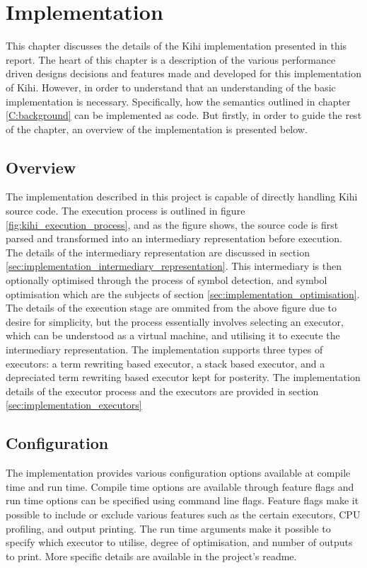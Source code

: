 \chapter{Implementation} \label{C:implementation} 
This chapter discusses the details of the Kihi implementation presented in this report. The heart of this chapter is a description of the various performance driven designs decisions and features made and developed for this implementation of Kihi. However, in order to understand that an understanding of the basic implementation is necessary. Specifically, how the semantics outlined in chapter \ref{C:background} can be implemented as code. But firstly, in order to guide the rest of the chapter, an overview of the implementation is presented below.

\section{Overview}


The implementation described in this project is capable of directly handling Kihi source code. The execution process is outlined in figure \ref{fig:kihi_execution_process}, and as the figure shows, the source code is first parsed and transformed into an intermediary representation before execution. The details of the intermediary representation are discussed in section \ref{sec:implementation_intermediary_representation}. This intermediary is then optionally optimised through the process of symbol detection, and symbol optimisation which are the subjects of section \ref{sec:implementation_optimisation}. The details of the execution stage are ommited from the above figure due to desire for simplicity, but the process essentially involves selecting an executor, which can be understood as a virtual machine, and utilising it to execute the intermediary representation. The implementation supports three types of executors: a term rewriting based executor, a stack based executor, and a depreciated term rewriting based executor kept for posterity. The implementation details of the executor process and the executors are provided in section \ref{sec:implementation_executors}


\section{Configuration}
The implementation provides various configuration options available at compile time and run time. Compile time options are available through feature flags and run time options can be specified using command line flags. Feature flags make it possible to include or exclude various features such as the certain executors, CPU profiling, and output printing. The run time arguments make it possible to specify which executor to utilise, degree of optimisation, and number of outputs to print. More specific details are available in the project's readme.


